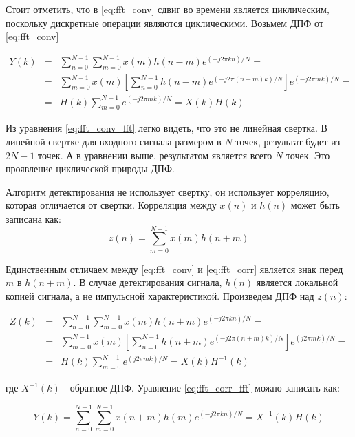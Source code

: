 Стоит отметить, что в \ref{eq:fft_conv} сдвиг во времени является циклическим, поскольку дискретные операции являются циклическими.
Возьмем ДПФ от \ref{eq:fft_conv}
\begin{center}
\begin{eqnarray}
	\label{eq:fft_conv_fft}
	Y(k) & = & \sum\limits_{n=0}^{N-1}\sum\limits_{m=0}^{N-1}{x(m)h(n-m)e^{(-j2\pi{kn})/N}}=\nonumber \\
	& = & \sum\limits_{m=0}^{N-1}{x(m)}[\sum\limits_{n=0}^{N-1}h(n-m)e^{(-j2\pi{(n-m)}k)/N}]e^{(-j2\pi{m}k)/N}=\\
	& = & H(k)\sum\limits_{m=0}^{N-1}e^{(-j2\pi{m}k)/N} = X(k)H(k)\nonumber 
\end{eqnarray}
\end{center}
Из уравнения \ref{eq:fft_conv_fft} легко видеть, что это не линейная свертка. В линейной свертке для входного сигнала размером в ${N}$ точек,
результат будет из ${2N-1}$ точек. А в уравнении выше, результатом является всего ${N}$ точек.
Это проявление циклической природы ДПФ.

Алгоритм детектирования не использует свертку, он использует корреляцию, которая отличается от свертки. Корреляция
между $x(n)$ и $h(n)$ может быть записана как:
\begin{equation}
	\label{eq:fft_corr}
	z(n) = \sum\limits_{m=0}^{N-1}{x(m)h(n+m)}
\end{equation}

Единственным отличаем между \ref{eq:fft_conv} и \ref{eq:fft_corr} является знак перед $m$ в ${h(n+m)}$.
В случае детектирования сигнала, $h(n)$ является локальной копией сигнала, а не импульсной характеристикой.
Произведем ДПФ над $z(n)$:
\begin{center}
\begin{eqnarray}
	\label{eq:fft_corr_fft}
	Z(k) & = & \sum\limits_{n=0}^{N-1}\sum\limits_{m=0}^{N-1}{x(m)h(n+m)e^{(-j2\pi{kn})/N}}=\nonumber \\
	& = & \sum\limits_{m=0}^{N-1}{x(m)}[\sum\limits_{n=0}^{N-1}h(n+m)e^{(-j2\pi{(n+m)}k)/N}]e^{(j2\pi{m}k)/N}=\\
	& = & H(k)\sum\limits_{m=0}^{N-1}e^{(j2\pi{m}k)/N} = X(k)H^{-1}(k)\nonumber 
\end{eqnarray}
\end{center}
где ${X^{-1}(k)}$ - обратное ДПФ. Уравнение \ref{eq:fft_corr_fft} можно записать как:

\begin{equation}
	\label{eq:fft_corr_fft_rev}
	Y(k) = \sum\limits_{n=0}^{N-1}\sum\limits_{m=0}^{N-1}{x(n+m)h(m)e^{(-j2\pi{kn})/N}}=X^{-1}(k)H(k)
\end{equation}

